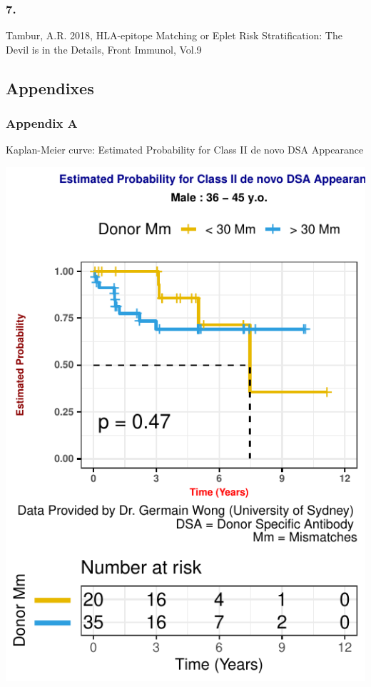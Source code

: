 \documentclass[a4paper,9pt,twocolumn,twoside,]{pinp}
\begin{document}
\hypertarget{section-6}{%
\subsubsection{7.}\label{section-6}}

Tambur, A.R. 2018, HLA-epitope Matching or Eplet Risk Stratification:
The Devil is in the Details, Front Immunol, Vol.9

\hypertarget{appendixes}{%
\subsection{Appendixes}\label{appendixes}}

\hypertarget{appendix-a}{%
\subsubsection{Appendix A}\label{appendix-a}}

Kaplan-Meier curve: Estimated Probability for Class II de novo DSA
Appearance

\begin{center}\includegraphics{Executive_Report_files/figure-latex/eplet-1} \end{center}
\end{document}
